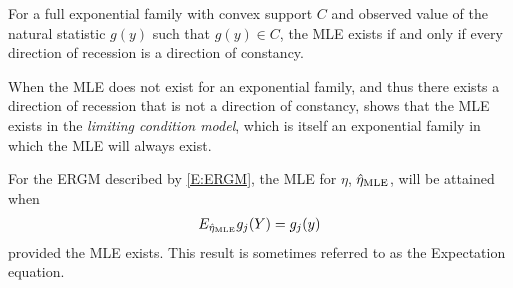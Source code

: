 \begin{theorem}
For a full exponential family with convex support $C$ and observed value of the natural statistic $g(y)$ such that $g(y) \in C$, the MLE exists if and only if every direction of recession is a direction of constancy.  
\end{theorem}

When the MLE does not exist for an exponential family, and thus there exists a direction of recession that is not a direction of constancy, \citet{Geyer:2009} shows that the MLE exists in the \textit{limiting condition model}, which is itself an exponential family in which the MLE will always exist.  

\begin{theorem} \label{Thm:MLE of ERGM}
For the ERGM described by \eqref{E:ERGM}, the MLE for $\eta$, $\hat{\eta}_{\textrm{MLE}}$, will be attained when
\begin{align}
	E_{\hat{\eta}_{\textrm{MLE}}} g_j(Y) = g_j(y)
\end{align}
provided the MLE exists.  This result is sometimes referred to as the Expectation equation.
\end{theorem}


